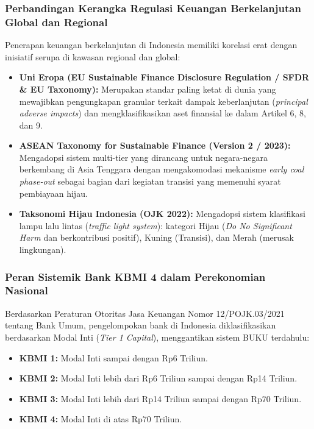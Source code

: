 \documentclass[12pt,a4paper]{article}
\numberwithin{equation}{section}
\begin{document}
\subsubsection*{Perbandingan Kerangka Regulasi Keuangan Berkelanjutan Global dan Regional}
\noindent
Penerapan keuangan berkelanjutan di Indonesia memiliki korelasi erat dengan inisiatif serupa di kawasan regional dan global:
\begin{itemize}
  \item \textbf{Uni Eropa (EU Sustainable Finance Disclosure Regulation / SFDR \& EU Taxonomy):} Merupakan standar paling ketat di dunia yang mewajibkan pengungkapan granular terkait dampak keberlanjutan (\emph{principal adverse impacts}) dan mengklasifikasikan aset finansial ke dalam Artikel 6, 8, dan 9.
  \item \textbf{ASEAN Taxonomy for Sustainable Finance (Version 2 / 2023):} Mengadopsi sistem multi-tier yang dirancang untuk negara-negara berkembang di Asia Tenggara dengan mengakomodasi mekanisme \emph{early coal phase-out} sebagai bagian dari kegiatan transisi yang memenuhi syarat pembiayaan hijau.
  \item \textbf{Taksonomi Hijau Indonesia (OJK 2022):} Mengadopsi sistem klasifikasi lampu lalu lintas (\emph{traffic light system}): kategori Hijau (\emph{Do No Significant Harm} dan berkontribusi positif), Kuning (Transisi), dan Merah (merusak lingkungan).
\end{itemize}

\subsubsection*{Peran Sistemik Bank KBMI 4 dalam Perekonomian Nasional}
\noindent
Berdasarkan Peraturan Otoritas Jasa Keuangan Nomor 12/POJK.03/2021 tentang Bank Umum, pengelompokan bank di Indonesia diklasifikasikan berdasarkan Modal Inti (\emph{Tier 1 Capital}), menggantikan sistem BUKU terdahulu:
\begin{itemize}
  \item \textbf{KBMI 1:} Modal Inti sampai dengan Rp6 Triliun.
  \item \textbf{KBMI 2:} Modal Inti lebih dari Rp6 Triliun sampai dengan Rp14 Triliun.
  \item \textbf{KBMI 3:} Modal Inti lebih dari Rp14 Triliun sampai dengan Rp70 Triliun.
  \item \textbf{KBMI 4:} Modal Inti di atas Rp70 Triliun.
\end{itemize}
\end{document}
